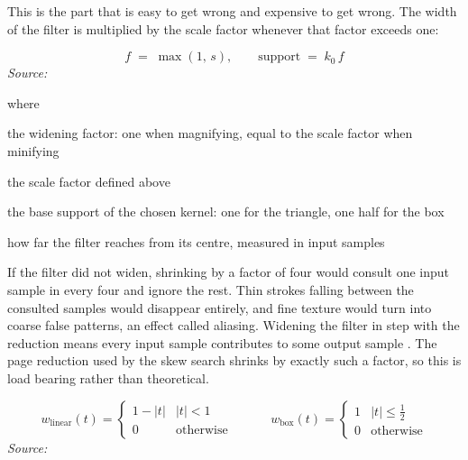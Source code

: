 This is the part that is easy to get wrong and expensive to get wrong. The width of the filter is multiplied by the scale factor whenever that factor exceeds one:


\begin{equation}
f \;=\; \max(1,\, s), \qquad \mathrm{support} \;=\; k_0\, f
\end{equation}
\noindent\emph{Source: }\cite{wolberg1990}


\noindent where
\begin{description}[leftmargin=2.4em,style=nextline,font=\normalfont\ttfamily]\setlength\itemsep{1pt}
  \item[{$f$}] \normalfont the widening factor: one when magnifying, equal to the scale factor when minifying
  \item[{$s$}] \normalfont the scale factor defined above
  \item[{$k_0$}] \normalfont the base support of the chosen kernel: one for the triangle, one half for the box
  \item[{$\mathrm{support}$}] \normalfont how far the filter reaches from its centre, measured in input samples
\end{description}
If the filter did not widen, shrinking by a factor of four would consult one input sample in every four and ignore the rest. Thin strokes falling between the consulted samples would disappear entirely, and fine texture would turn into coarse false patterns, an effect called aliasing. Widening the filter in step with the reduction means every input sample contributes to some output sample \cite{wolberg1990}. The page reduction used by the skew search shrinks by exactly such a factor, so this is load bearing rather than theoretical.



\begin{equation}
w_{\mathrm{linear}}(t) = \begin{cases} 1 - |t| & |t| < 1 \\ 0 & \text{otherwise} \end{cases} \qquad\quad w_{\mathrm{box}}(t) = \begin{cases} 1 & |t| \le \tfrac{1}{2} \\ 0 & \text{otherwise} \end{cases}
\end{equation}
\noindent\emph{Source: }\cite{wolberg1990}


